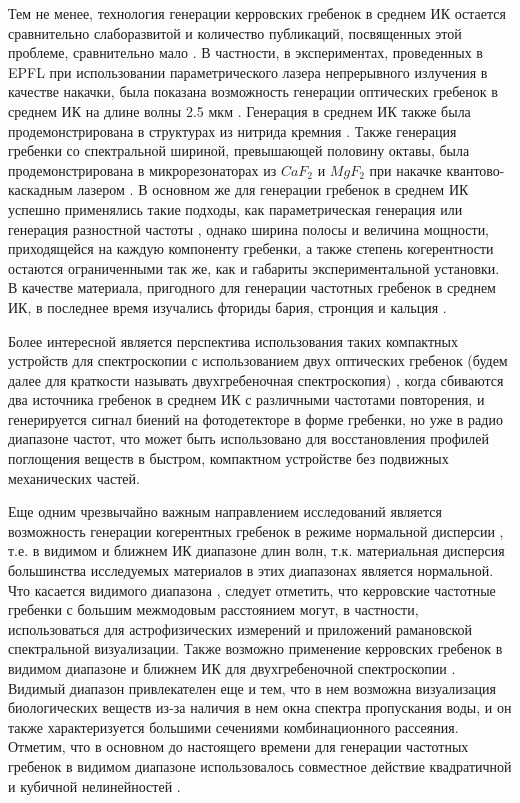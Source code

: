 Тем не менее, технология генерации керровских гребенок в среднем ИК остается сравнительно слаборазвитой и количество публикаций, посвященных этой проблеме, сравнительно мало \cite{Schliesser2012,Wang2013,Griffith2015,Griffith2016,Savchenkov2015}. В частности, в экспериментах, проведенных в EPFL при использовании параметрического лазера непрерывного излучения в качестве накачки, была показана возможность генерации оптических гребенок в среднем ИК на длине волны 2.5 мкм \cite{Wang2013}. Генерация в среднем ИК также была продемонстрирована в структурах из нитрида кремния \cite{Griffith2015,Griffith2016}. Также генерация гребенки со спектральной шириной, превышающей половину октавы, была продемонстрирована в микрорезонаторах из $CaF_2$ и $MgF_2$ при накачке квантово-каскадным лазером \cite{Savchenkov2015}. В основном же для генерации гребенок в среднем ИК успешно применялись такие подходы, как параметрическая генерация или генерация разностной частоты \cite{Adler2009,Leindecker2011,Maddaloni2006,Cruz2015}, однако ширина полосы и величина мощности, приходящейся на каждую компоненту гребенки, а также степень когерентности остаются ограниченными так же, как и габариты экспериментальной установки. В качестве материала, пригодного для генерации частотных гребенок в среднем ИК, в последнее время изучались фториды бария, стронция и кальция \cite{Grudinin2016,Lin2015,Way2012,Lecaplain2016}.


Более интересной является перспектива использования таких компактных устройств для спектроскопии с использованием двух оптических гребенок (будем далее для краткости называть двухгребеночная спектроскопия) \cite{Ideguchi2014,Coddington2016,Suh2016}, когда сбиваются два источника гребенок в среднем ИК с различными частотами повторения, и генерируется сигнал биений на фотодетекторе в форме гребенки, но уже в радио диапазоне частот, что может быть использовано для восстановления профилей поглощения веществ в быстром, компактном устройстве без подвижных механических частей.


Еще одним чрезвычайно важным направлением исследований является возможность генерации когерентных гребенок в режиме нормальной дисперсии \cite{Xue2016nano}, т.е. в видимом и ближнем ИК диапазоне длин волн, т.к. материальная дисперсия большинства исследуемых материалов в этих диапазонах является нормальной. Что касается видимого диапазона \cite{Miller2014,Jung2014}, следует отметить, что керровские частотные гребенки с большим межмодовым расстоянием могут, в частности, использоваться для астрофизических измерений \cite{Benedick2010,Glenday2015} и приложений рамановской спектральной визуализации. Также возможно применение керровских гребенок в видимом диапазоне и ближнем ИК для двухгребеночной спектроскопии \cite{Zhu2013}. Видимый диапазон привлекателен еще и тем, что в нем возможна визуализация биологических веществ из-за наличия в нем окна спектра пропускания воды, и он также характеризуется большими сечениями комбинационного рассеяния. Отметим, что в основном до настоящего времени для генерации частотных гребенок в видимом диапазоне использовалось совместное действие квадратичной и кубичной нелинейностей \cite{Miller2014,Jung2014}.


